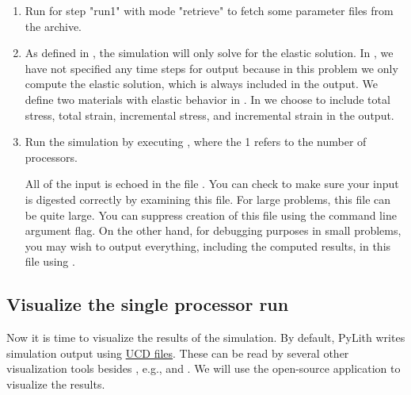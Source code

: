 \begin{enumerate}
\item Run  for step "run1" with mode "retrieve" to
  fetch some parameter files from the archive.

  \begin{screen}
    \shellprompt{}
  \end{screen}
  
\item As defined in , the simulation will
  only solve for the elastic solution. In ,
  we have not specified any time steps for output because in this
  problem we only compute the elastic solution, which is always
  included in the output. We define two materials with elastic
  behavior in . In
   we choose to include total stress,
  total strain, incremental stress, and incremental strain in the
  output.
\item Run the simulation by executing , where
  the 1 refers to the number of processors.

  \begin{tip}
    All of the input is echoed in the file .
    You can check to make sure your input is digested correctly by
    examining this file. For large problems, this file can be quite
    large. You can suppress creation of this file using the command
    line argument  flag. On the
    other hand, for debugging purposes in small problems, you may wish
    to output everything, including the computed results, in this file
    using .
  \end{tip}
  
  \begin{screen}
    \shellprompt{}
  \end{screen}
\end{enumerate}

\subsection{Visualize the single processor run}

Now it is time to visualize the results of the simulation. By default,
PyLith writes simulation output using
\href{http://help.avs.com/Express/doc/help/reference/dvmac/UCD\_Form.htm}{
  UCD files}.  These can be read by several other visualization tools
besides , e.g.,  and
. We will use the open-source application
 to visualize the results.
    
